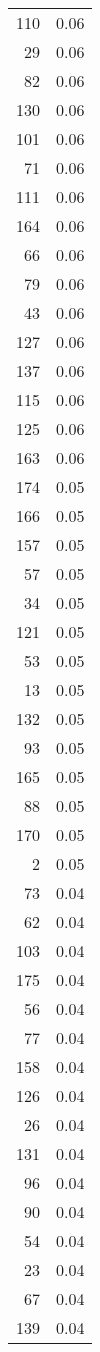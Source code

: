 \begin{longtable}{rr}
  110 & 0.06 \\ 
   29 & 0.06 \\ 
   82 & 0.06 \\ 
  130 & 0.06 \\ 
  101 & 0.06 \\ 
   71 & 0.06 \\ 
  111 & 0.06 \\ 
  164 & 0.06 \\ 
   66 & 0.06 \\ 
   79 & 0.06 \\ 
   43 & 0.06 \\ 
  127 & 0.06 \\ 
  137 & 0.06 \\ 
  115 & 0.06 \\ 
  125 & 0.06 \\ 
  163 & 0.06 \\ 
  174 & 0.05 \\ 
  166 & 0.05 \\ 
  157 & 0.05 \\ 
   57 & 0.05 \\ 
   34 & 0.05 \\ 
  121 & 0.05 \\ 
   53 & 0.05 \\ 
   13 & 0.05 \\ 
  132 & 0.05 \\ 
   93 & 0.05 \\ 
  165 & 0.05 \\ 
   88 & 0.05 \\ 
  170 & 0.05 \\ 
    2 & 0.05 \\ 
   73 & 0.04 \\ 
   62 & 0.04 \\ 
  103 & 0.04 \\ 
  175 & 0.04 \\ 
   56 & 0.04 \\ 
   77 & 0.04 \\ 
  158 & 0.04 \\ 
  126 & 0.04 \\ 
   26 & 0.04 \\ 
  131 & 0.04 \\ 
   96 & 0.04 \\ 
   90 & 0.04 \\ 
   54 & 0.04 \\ 
   23 & 0.04 \\ 
   67 & 0.04 \\ 
  139 & 0.04 \\ 

\end{longtable}
